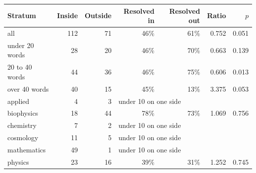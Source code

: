 \begin{tabular}{@{}lrrrrrr@{}}
\toprule
Stratum & Inside & Outside & Resolved in & Resolved out & Ratio & $p$ \\
\midrule
all & 112 & 71 & 46\% & 61\% & 0.752 & 0.051 \\
under 20 words & 28 & 20 & 46\% & 70\% & 0.663 & 0.139 \\
20 to 40 words & 44 & 36 & 46\% & 75\% & 0.606 & 0.013 \\
over 40 words & 40 & 15 & 45\% & 13\% & 3.375 & 0.053 \\
applied & 4 & 3 & \multicolumn{4}{l}{under 10 on one side} \\
biophysics & 18 & 44 & 78\% & 73\% & 1.069 & 0.756 \\
chemistry & 7 & 2 & \multicolumn{4}{l}{under 10 on one side} \\
cosmology & 11 & 5 & \multicolumn{4}{l}{under 10 on one side} \\
mathematics & 49 & 1 & \multicolumn{4}{l}{under 10 on one side} \\
physics & 23 & 16 & 39\% & 31\% & 1.252 & 0.745 \\
\bottomrule
\end{tabular}
